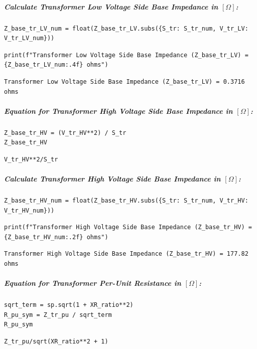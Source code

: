 \subparagraph{Calculate Transformer Low Voltage Side Base Impedance in $\left[\Omega\right]$:}

\begin{verbatim}
Z_base_tr_LV_num = float(Z_base_tr_LV.subs({S_tr: S_tr_num, V_tr_LV: V_tr_LV_num}))
\end{verbatim}

\begin{verbatim}
print(f"Transformer Low Voltage Side Base Impedance (Z_base_tr_LV) = {Z_base_tr_LV_num:.4f} ohms")
\end{verbatim}

\begin{verbatim}
Transformer Low Voltage Side Base Impedance (Z_base_tr_LV) = 0.3716 ohms
\end{verbatim}

\subparagraph{Equation for Transformer High Voltage Side Base Impedance in $\left[\Omega\right]$:}

\begin{verbatim}
Z_base_tr_HV = (V_tr_HV**2) / S_tr
Z_base_tr_HV
\end{verbatim}

\begin{verbatim}
V_tr_HV**2/S_tr
\end{verbatim}

\subparagraph{Calculate Transformer High Voltage Side Base Impedance in $\left[\Omega\right]$:}

\begin{verbatim}
Z_base_tr_HV_num = float(Z_base_tr_HV.subs({S_tr: S_tr_num, V_tr_HV: V_tr_HV_num}))
\end{verbatim}

\begin{verbatim}
print(f"Transformer High Voltage Side Base Impedance (Z_base_tr_HV) = {Z_base_tr_HV_num:.2f} ohms")
\end{verbatim}

\begin{verbatim}
Transformer High Voltage Side Base Impedance (Z_base_tr_HV) = 177.82 ohms
\end{verbatim}

\subparagraph{Equation for Transformer Per-Unit Resistance in $\left[\Omega\right]$:}

\begin{verbatim}
sqrt_term = sp.sqrt(1 + XR_ratio**2)
R_pu_sym = Z_tr_pu / sqrt_term
R_pu_sym
\end{verbatim}

\begin{verbatim}
Z_tr_pu/sqrt(XR_ratio**2 + 1)
\end{verbatim}

